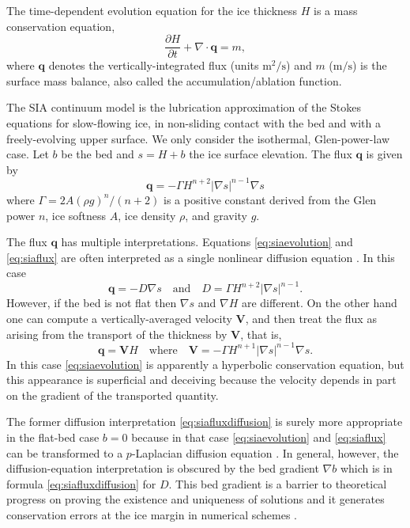 \documentclass[twocolumn,letterpaper]{igs}
\newcommand\bq{\mathbf{q}}
\newcommand\bV{\mathbf{V}}
\newcommand{\Div}{\nabla\cdot}
\newcommand{\grad}{\nabla}
\begin{document}
The time-dependent evolution equation for the ice thickness $H$ is a mass conservation equation,
\begin{equation}
\frac{\partial H}{\partial t} + \Div \bq = m,  \label{eq:siaevolution}
\end{equation}
where $\bq$ denotes the vertically-integrated flux (units $\text{m}^2/\text{s}$) and $m$ ($\text{m}/\text{s}$) is the surface mass balance, also called the accumulation/ablation function.

The SIA continuum model is the lubrication approximation \citep{Fowler1997} of the Stokes equations for slow-flowing ice, in non-sliding contact with the bed and with a freely-evolving upper surface.  We only consider the isothermal, Glen-power-law \citep{GreveBlatter2009} case.  Let $b$ be the bed and $s = H+b$ the ice surface elevation.  The flux $\bq$ is given by
\begin{equation}
\bq = - \Gamma H^{n+2} |\grad s|^{n-1} \grad s  \label{eq:siaflux}
\end{equation}
where $\Gamma = 2 A (\rho g)^n / (n+2)$ is a positive constant derived from the Glen power $n$, ice softness $A$, ice density $\rho$, and gravity $g$.

The flux $\bq$ has multiple interpretations.  Equations \eqref{eq:siaevolution} and \eqref{eq:siaflux} are often interpreted as a single nonlinear diffusion equation \cite{Huybrechtsetal1996}.  In this case
\begin{equation}
\bq = - D \grad s \quad \text{and} \quad D =  \Gamma H^{n+2} |\grad s|^{n-1}. \label{eq:siafluxdiffusion}
\end{equation}
However, if the bed is not flat then $\grad s$ and $\grad H$ are different.  On the other hand one can compute a vertically-averaged velocity $\bV$, and then treat the flux as arising from the transport of the thickness by $\bV$, that is,
\begin{equation}
\bq = \bV H \quad \text{where} \quad \bV = - \Gamma H^{n+1} |\grad s|^{n-1} \grad s. \label{eq:siafluxvelocity}
\end{equation}
In this case \eqref{eq:siaevolution} is apparently a hyperbolic conservation equation, but this appearance is superficial and deceiving because the velocity depends in part on the gradient of the transported quantity.

The former diffusion interpretation \eqref{eq:siafluxdiffusion} is surely more appropriate in the flat-bed case $b=0$ because in that case \eqref{eq:siaevolution} and \eqref{eq:siaflux} can be transformed to a $p$-Laplacian diffusion equation \citep{Vazquezetal2003}.  In general, however, the diffusion-equation interpretation is obscured by the bed gradient $\grad b$ which is in formula \eqref{eq:siafluxdiffusion} for $D$.  This bed gradient is a barrier to theoretical progress on proving the existence and uniqueness of solutions \citep{JouvetBueler2012} and it generates conservation errors at the ice margin in numerical schemes \citep{JaroschSchoofAnslow2013}.
\end{document}
